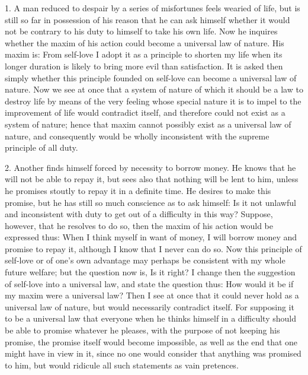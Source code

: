 1. A man reduced to despair by a series of misfortunes feels wearied
of life, but is still so far in possession of his reason that he can
ask himself whether it would not be contrary to his duty to himself to
take his own life. Now he inquires whether the maxim of his action
could become a universal law of nature. His maxim is: From self-love I
adopt it as a principle to shorten my life when its longer duration is
likely to bring more evil than satisfaction. It is asked then simply
whether this principle founded on self-love can become a universal law
of nature. Now we see at once that a system of nature of which it
should be a law to destroy life by means of the very feeling whose
special nature it is to impel to the improvement of life would
contradict itself, and therefore could not exist as a system of
nature; hence that maxim cannot possibly exist as a universal law of
nature, and consequently  would be wholly inconsistent with
the supreme principle of all duty.

2. Another finds himself forced by necessity to borrow money. He knows
that he will not be able to repay it, but sees also that nothing will
be lent to him, unless he promises stoutly to repay it in a definite
time. He desires to make this promise, but he has still so much
conscience as to ask himself: Is it not unlawful and inconsistent with
duty to get out of a difficulty in this way? Suppose, however, that he
resolves to do so, then the maxim of his action would be expressed
thus: When I think myself in want of money, I will borrow money and
promise to repay it, although I know that I never can do so. Now this
principle of self-love or of one's own advantage may perhaps be
consistent with my whole future welfare; but the question now is, Is
it right? I change then the suggestion of self-love into a universal
law, and state the question thus: How would it be if my maxim were a
universal law? Then I see at once that it could never hold as a
universal law of nature, but would necessarily contradict itself. For
supposing it to be a universal law that everyone when he thinks
himself in a difficulty should be able to promise whatever he pleases,
with the purpose of not keeping his promise, the promise itself would
become impossible, as well as the end that one might have in view in
it, since no one would consider that anything was promised to him, but
would ridicule all such statements as vain pretences.

